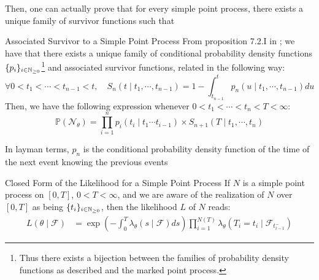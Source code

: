 \documentclass[11pt]{book}
\newcommand{\sequence}[1]{\{ #1 \}_{ i \in \N} }
\begin{document}
Then, one can actually prove that for every simple point process, there exists a unique family of survivor functions such that

\begin{theoreme}{Associated Survivor to a Simple Point Process}
From proposition 7.2.I in \cite{daley}; we have that there exists a unique family of conditional probability density functions $\sequence{p_i}$\footnote{Thus there exists a bijection between the families of probability density functions as described and the marked point process.} and associated survivor functions, related in the following way:
\begin{equation}
\forall 0 < t_1 < \cdots < t_{n-1} < t, \quad S_n( t \mid t_1, \cdots, t_{n-1} ) = 1 - \int_{t_{n-1}}^t p_n ( u \mid t_1, \cdots, t_{n-1} ) du
\end{equation}
Then, we have the following expression whenever $0 < t_1 < \cdots < t_{n} < T < \infty $:
\begin{equation}
\mathbb P ( \mathcal N_{\theta} )  =   \prod_{i = 1}^n p_i ( t_i \mid t_1 \cdots t_{i-1} ) \times S_{n+1} ( T \mid t_1, \cdots, t_n )  
\end{equation}
\end{theoreme}


\begin{remarque}
In layman terms, $p_n$ is the conditional probability density function of the time of the next event knowing the previous events
\end{remarque}


\begin{theoreme}[label = theoreme_expression_ln_lik]{Closed Form of the Likelihood for a Simple Point Process}
If $N$ is a simple point process on $[0,T]$,  $0 < T < \infty$, and we are aware of the realization of $N$ over $[0,T]$ as being $\sequence{t_i}$, then the likelihood $L$ of $N$ reads:
\begin{align}
L( \theta \mid \mathcal F ) &= \exp \left ( - \int_{0}^{T} \lambda_{\theta} ( s \mid \mathcal F ) ds \right )  \prod_{i=1}^{N(T)}  \lambda_{\theta} ( T_i = t_i \mid \mathcal F_{t_{i-1}^-} )  
\end{align}
\end{theoreme}
\end{document}
